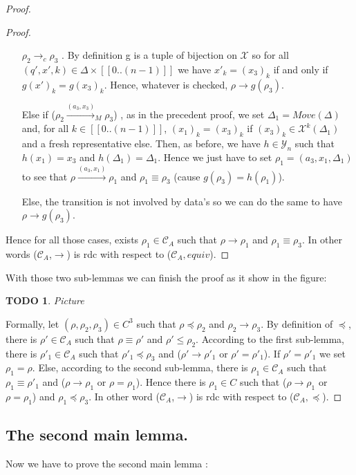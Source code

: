 \documentclass[a4paper,10pt]{report}
\newtheorem{td}{TODO}
\newcommand{\seg}[1]{[\![#1]\!]}
\newcommand{\ts}{\seg{0 .. (n-1)}}
\newcommand{\C}{\mathcal{C}_{A}}
\newcommand{\Xa}{\mathcal{X}}
\newcommand{\Y}{\mathcal{Y}_{n}}
\begin{document}
\begin{proof}
\begin{proof}
    \begin{itemize}
    \item [$\rho_2 \rightarrow_{c} \rho_3$]. By definition g is a tuple of bijection on $\Xa$ so for all $(q',x',k) \in \Delta \times \ts$ we have 
    $x'_k = (x_3)_k$ if and only if  $g(x')_k = {g(x_3)}_k$. Hence, whatever is checked, $\rho \rightarrow g(\rho_3)$.  
    \item [Else if ($\rho_2 \xrightarrow{(a_3,x_3)}_{M} \rho_3$)], as in the precedent proof, we set $\Delta_1 = Move(\Delta)$ and, for all $k \in \ts$, ${(x_1)}_k = {(x_3)}_k$ if ${(x_3)}_k \in \Xa^k(\Delta_1)$ and a fresh representative else.
     Then, as before, we have $h \in \Y$ such that $h(x_1) = x_3$ and $h(\Delta_1) = \Delta_1$.
     Hence we just have to set $\rho_1 = (a_3,x_1,\Delta_1)$ to see that $\rho \xrightarrow{(a_3,x_1)} \rho_1$ and $\rho_1 \equiv \rho_3$ (cause $g(\rho_3) = h(\rho_1)$).
    \item [Else,] the transition is not involved by data's so we can do the same to have $\rho \rightarrow g(\rho_3)$.
    \end{itemize}
    Hence for all those cases, exists $\rho_1 \in \C$ such that $\rho \xrightarrow{} \rho_1$ and $\rho_1 \equiv \rho_3$. 
    In other words ($\C$,$\rightarrow$) is rdc with respect to ($\C,equiv$).
  \end{proof}
  With those two sub-lemmas we can finish the proof as it show in the figure: 
  \begin{td} 
   Picture
  \end{td}
  Formally, let $(\rho,\rho_2,\rho_3) \in C^3 $ such that $ \rho \preceq \rho_2 $ and $ \rho_2 \rightarrow \rho_3$.
  By definition of $\preceq$, there is $\rho' \in \C$ such that $\rho \equiv \rho'$ and $\rho' \leq \rho_2$.
  According to the first sub-lemma, there is $\rho'_1 \in \C$ such that $\rho'_1 \preceq \rho_3$ and ($\rho' \rightarrow \rho'_1$ or $\rho' = \rho'_1$).
  If $\rho' = \rho'_1$ we set $\rho_1 = \rho$.
  Else, according to the second sub-lemma, there is $\rho_1 \in \C$ such that $\rho_1 \equiv \rho'_1$ and ($\rho \rightarrow \rho_1$ or $\rho =\rho_1$).
  Hence there is $\rho_1 \in C $ such that ($\rho \rightarrow \rho_1$ or $\rho = \rho_1$) and $\rho_1 \preceq \rho_3$.
  In other word ($\C$,$\rightarrow$) is rdc with respect to ($\C,\preceq$).

\end{proof}

\subsection{The second main lemma.}
Now we have to prove the second main lemma :
\end{document}
